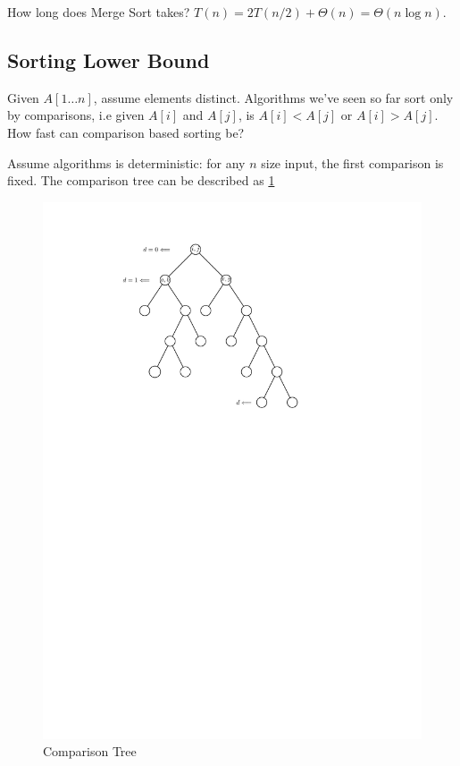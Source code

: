 How long does Merge Sort takes?
$T(n) = 2T(n/2) + \Theta(n) = \Theta(n \log n)$.

\subsection{Sorting Lower Bound}
Given $A[1 \ldots n]$, assume elements distinct.
Algorithms we've seen so far sort only by comparisons,
i.e given $A[i]$ and $A[j]$, is $A[i] < A[j]$ or $A[i] > A[j]$.
How fast can comparison based sorting be?

Assume algorithms is deterministic: for any $n$ size input,
the first comparison is fixed.
The comparison tree can be described as \cref{fig:sortinglowerbound}

\begin{figure}[H]
    \caption{Comparison Tree}\label{fig:sortinglowerbound}
    \centering
    \includegraphics[scale=1.1]{fig/sortlowerbound}
\end{figure}

